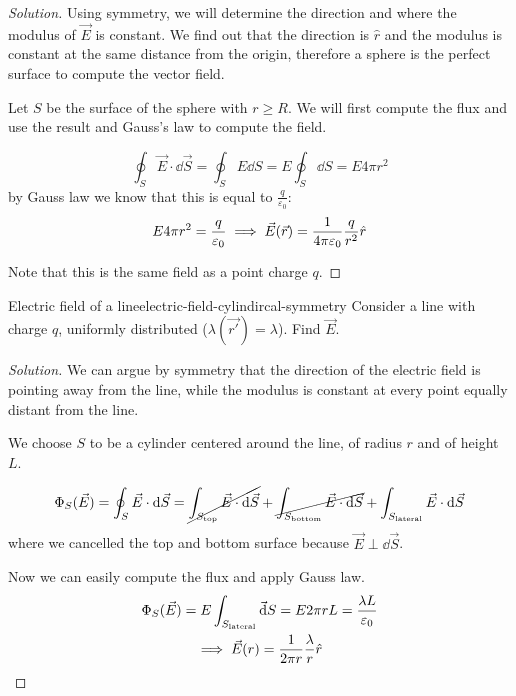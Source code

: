 \documentclass[12pt]{extarticle}
\begin{document}
\begin{proof}[Solution]
    Using symmetry, we will determine the direction and where the modulus of $\vec E$ is constant.
    We find out that the direction is $\hat r$ and the modulus is constant at the same distance from the origin, therefore a sphere is the perfect surface to compute the vector field.

    Let $S$ be the surface of the sphere with $r \geq R$. We will first compute the flux and use the result and Gauss's law to compute the field.

    \begin{equation}
        \oint_S \vec E \cdot \dd{\vec S} = \oint_S E\dd{S} = E \oint_S \dd{S} = E 4 \pi r^2
    \end{equation}
    by Gauss law we know that this is equal to $\frac{q}{\varepsilon_0}$:
    \begin{equation}
        E 4 \pi r^2 = \frac{q}{\varepsilon_0} \implies \vec E(\vec r) = \frac{1}{4 \pi \varepsilon_0} \frac{q}{r^2} \hat r
    \end{equation}

    Note that this is the same field as a point charge $q$.
\end{proof}

\begin{example}{Electric field of a line}{electric-field-cylindircal-symmetry}
    Consider a line with charge $q$, uniformly distributed ($\lambda(\vec{r'}) = \lambda$).
    Find $\vec E$.
\end{example}

\begin{proof}[Solution]
    We can argue by symmetry that the direction of the electric field is pointing away from the line, while the modulus is constant at every point equally distant from the line.

    We choose $S$ to be a cylinder centered around the line, of radius $r$ and of height $L$.

    \begin{equation}
        \Phi_S(\vec E) = \oint_S \vec E \cdot \dd{\vec S} = \cancel{\int_{S_\text{top}} \vec E \cdot  \dd{\vec S}} + \cancel{\int_{S_\text{bottom}} \vec E \cdot  \dd{\vec S}} + \int_{S_\text{lateral}} \vec E \cdot  \dd{\vec S}
    \end{equation}
    where we cancelled the top and bottom surface because $\vec E \perp \dd{\vec S}$.

    Now we can easily compute the flux and apply Gauss law.
    \begin{gather}
        \Phi_S(\vec E) =  E \int_{S_\text{lateral}} \vec \dd{S} = E 2 \pi r L = \frac{\lambda L}{\varepsilon_0}\\
        \implies \vec E(r) = \frac{1}{2 \pi r} \frac{\lambda}{r} \hat r
    \end{gather}
\end{proof}
\end{document}

